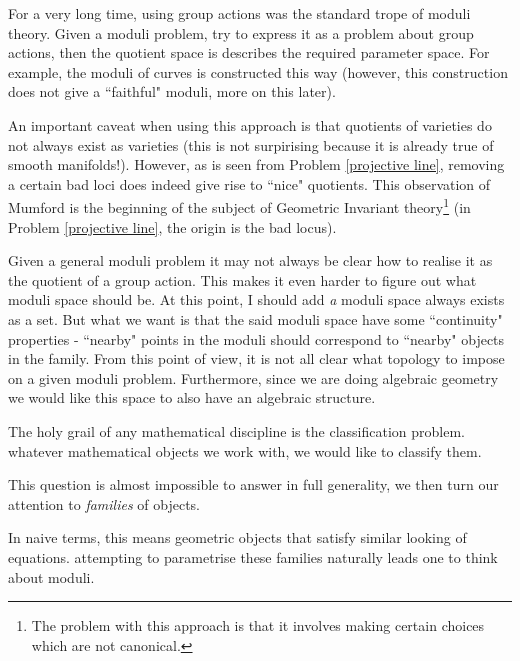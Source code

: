 \documentclass[ignorenonframetext]{beamer}
\theoremstyle{definition}
\begin{document}

For a very long time, using group actions was the standard trope of moduli theory. Given a moduli problem, try to express it as a problem about group actions, then the quotient space is describes the required parameter space. For example, the moduli of curves is constructed this way (however, this construction does not give a ``faithful" moduli, more on this later).

An important caveat when using this approach is that quotients of varieties do not always exist as varieties (this is not surpirising because it is already true of smooth manifolds!). However, as is seen from Problem \ref{projective line}, removing a certain bad loci does indeed give rise to ``nice" quotients. This observation of Mumford is the beginning of the subject of Geometric Invariant theory\footnote{The problem with this approach is that it involves making certain choices which are not canonical.} (in Problem \ref{projective line}, the origin is the bad locus).

Given a general moduli problem it may not always be clear how to realise it as the quotient of a group action. This makes it even harder to figure out what moduli space should be. At this point, I should add \textit{a} moduli space always exists as a set. But what we want is that the said moduli space have some ``continuity" properties - ``nearby" points in the moduli should correspond to ``nearby" objects in the family. From this point of view, it is not all clear what topology to impose on a given moduli problem. Furthermore, since we are doing algebraic geometry we would like this space to also have an algebraic structure.

The holy grail of any mathematical discipline is the classification problem. whatever mathematical objects we work with, we would like to classify them. 

This question is almost impossible to answer in full generality, we then turn our attention to \textit{families} of objects. 

In naive terms, this means geometric objects that satisfy similar looking of equations. attempting to parametrise these families naturally leads one to think about moduli.
\end{document}
